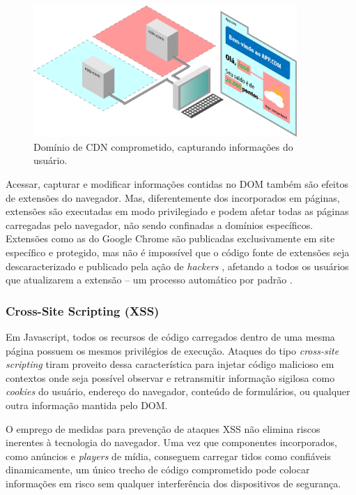 \begin{figure}
	\centering
	\includegraphics[width=10cm]{diagramas/diagrama02.pdf}
	\caption{Domínio de CDN comprometido, capturando informações do usuário.}
	\label{Fig: diagrama02}
\end{figure}

Acessar, capturar e modificar informações contidas no DOM também são efeitos de extensões do navegador. Mas, diferentemente dos {\scripts} incorporados em páginas, extensões são executadas em modo privilegiado e podem afetar todas as páginas carregadas pelo navegador, não sendo confinadas a domínios específicos. Extensões como as do Google Chrome são publicadas exclusivamente em site específico e protegido, mas não é impossível que o código fonte de extensões seja descaracterizado e publicado pela ação de \textit{hackers} \cite{Spring2017}, afetando a todos os usuários que atualizarem a extensão -- um processo automático por padrão \cite{Google2017}.


\subsubsection{Cross-Site Scripting (XSS)}
Em Javascript, todos os recursos de código carregados dentro de uma mesma página possuem os mesmos privilégios de execução. Ataques do tipo \textit{cross-site scripting} tiram proveito dessa característica para injetar código malicioso em contextos onde seja possível observar e retransmitir informação sigilosa como \textit{cookies} do usuário, endereço do navegador, conteúdo de formulários, ou qualquer outra informação mantida pelo DOM.

O emprego de medidas para prevenção de ataques XSS \cite{OWASP:XSS-CheatSheet} não elimina riscos inerentes à tecnologia do navegador. Uma vez que componentes incorporados, como anúncios e \textit{players} de mídia, conseguem carregar {\scripts} tidos como confiáveis dinamicamente, um único trecho de código comprometido pode colocar informações em risco sem qualquer interferência dos dispositivos de segurança.

